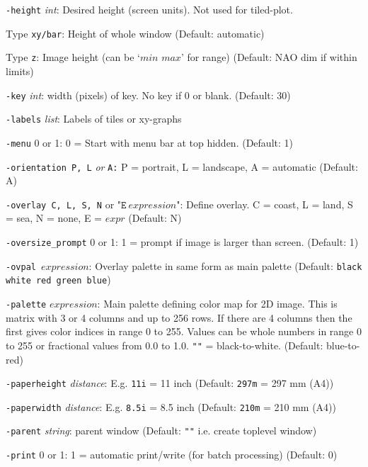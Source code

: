 \begin{simpleitems}
  \texttt{-height} 
  \emph{int}: Desired height (screen units). Not used for tiled-plot.
\begin{bullets}
  \item  Type \texttt{xy/bar}: Height of whole window (Default: automatic)
  \item  Type \texttt{z}: Image height (can be `$\mathit{min}$ $\mathit{max}$' for range)
    (Default: NAO dim if within limits)
\end{bullets}
  \item
  \texttt{-key} 
  \emph{int}: width (pixels) of key. No key if 0 or blank. (Default: 30)
  \item
  \texttt{-labels} 
  \emph{list}: Labels of tiles or xy-graphs
  \item
  \texttt{-menu} 0 or 1: 0 = Start with menu bar at top hidden.
  (Default: 1)
  \item
  \texttt{-orientation P, L} 
  \emph{or} 
  \texttt{A:} P = portrait, L = landscape, A = automatic (Default:
  A)
  \item
  \texttt{-overlay C, L, S, N} 
  or $\texttt{"E}~\mathit{expression}\texttt{"}$: Define overlay. C = coast, L = land, S =
  sea, N = none, E = $\mathit{expr}$ (Default: N)
  \item
  \texttt{-oversize\_prompt} 0 or 1: 1 = prompt if image is larger
  than screen. (Default: 1)
  \item
  \texttt{-ovpal}~$\mathit{expression}$:
    Overlay palette in same form as main palette
  (Default: \texttt{black white red green blue})
  \item
  \texttt{-palette} $\mathit{expression}$:
  Main palette defining color map for 2D image. This
  is matrix with 3 or 4 columns and up to 256 rows. If there are 4
  columns then the first gives color indices in range 0 to 255. Values
  can be whole numbers in range 0 to 255 or fractional values from 0.0
  to 1.0. 
  \texttt{""} = black-to-white. (Default: blue-to-red)
  \item
  \texttt{-paperheight} 
  \emph{distance}: E.g. 
  \texttt{11i} = 11 inch (Default: 
  \texttt{297m} = 297 mm (A4))
  \item
  \texttt{-paperwidth} 
  \emph{distance}: E.g. 
  \texttt{8.5i} = 8.5 inch (Default: 
  \texttt{210m} = 210 mm (A4))
  \item
  \texttt{-parent} 
  \emph{string}: parent window (Default: 
  \texttt{""} i.e. create toplevel window)
  \item
  \texttt{-print} 0 or 1: 1 = automatic print/write (for batch
  processing) (Default: 0)

\end{simpleitems}
